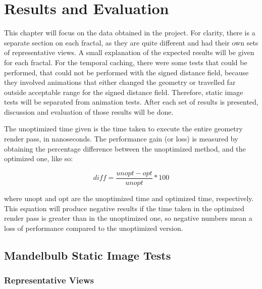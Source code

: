 \chapter{Results and Evaluation}
\label{chapter:results-and-evaluation}

This chapter will focus on the data obtained in the project. For clarity, there is a separate section on each fractal, as they are quite different and had their own sets of representative views. A small explanation of the expected results will be given for each fractal. For the temporal caching, there were some tests that could be performed, that could not be performed with the signed distance field, because they involved animations that either changed the geometry or travelled far outside acceptable range for the signed distance field. Therefore, static image tests will be separated from animation tests. After each set of results is presented, discussion and evaluation of those results will be done.\newline

The unoptimized time given is the time taken to execute the entire geometry render pass, in nanoseconds. The performance gain (or loss) is measured by obtaining the percentage difference between the unoptimized method, and the optimized one, like so:

\begin{equation}
	diff = \frac{unopt - opt}{unopt} * 100
\end{equation}

where unopt and opt are the unoptimized time and optimized time, respectively. This equation will produce negative results if the time taken in the optimized render pass is greater than in the unoptimized one, so negative numbers mean a loss of performance compared to the unoptimized version.

\section{Mandelbulb Static Image Tests}

\subsection{Representative Views}

